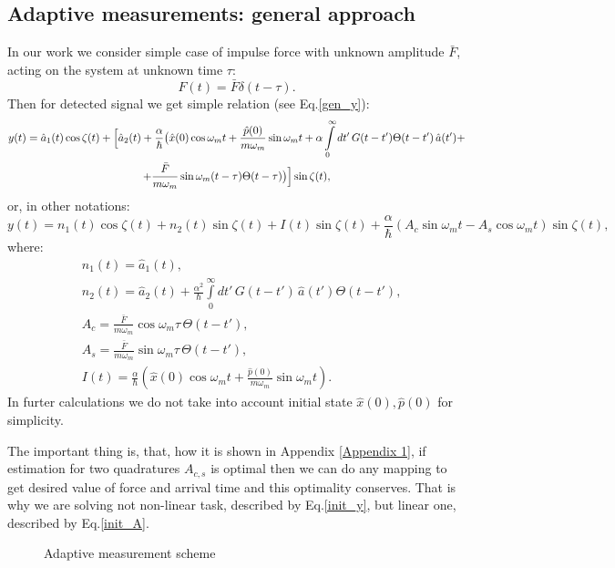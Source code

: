 \subsection{Adaptive measurements: general approach}
In our work we consider simple case of impulse force with unknown amplitude $\bar{F}$, acting on the system at unknown time $\tau$: 
\begin{equation}
 F(t)=\bar{F}\delta(t-\tau).
\end{equation}
Then for detected signal we get simple relation (see Eq.\ref{gen_y}):
\begin{multline}\label{init_y}
 y(t)=\hat{a}_1(t)\cos \zeta(t)+\Bigl[\hat{a}_2(t)+\frac{\alpha}{\hbar}\bigl(\hat{x}(0) \cos \omega_m t+ \frac{\hat{p}(0)}{m \omega_m} \sin \omega_m t + \alpha \int\limits_0^{\infty} dt' \, G(t-t') \Theta(t-t')\, \hat{a}(t') +\\+ \frac{\bar{F}}{m\omega_m}\sin\omega_m(t-\tau)\Theta(t-\tau)\bigr)\Bigr]\sin\zeta(t),
\end{multline}
or, in other notations:
\begin{equation}\label{init_A}
 y(t)=n_1(t)\cos\zeta(t)+  n_2(t)\sin\zeta(t) + I(t) \sin\zeta(t) + \frac{\alpha}{\hbar}(A_c\sin\omega_mt - A_s\cos\omega_mt)\sin\zeta(t),
\end{equation}
where:
\begin{align}
& n_1(t)=\hat{a}_1(t),\\
& n_2(t)=\hat{a}_2(t)+\frac{\alpha^2}{\hbar}\int\limits_0^{\infty} dt' \, G(t-t') \, \hat{a}(t') \Theta(t-t'),\\
& A_c = \frac{\bar{F}}{m\omega_m}\cos\omega_m\tau\,\Theta(t-t'),\\
& A_s = \frac{\bar{F}}{m\omega_m}\sin\omega_m\tau\,\Theta(t-t'),\\
& I(t) = \frac{\alpha}{\hbar}(\hat{x}(0) \cos \omega_m t+ \frac{\hat{p}(0)}{m \omega_m} \sin \omega_m t).
\end{align}
In furter calculations we do not take into account initial state $\hat{x}(0),\hat{p}(0)$ for simplicity.

The important thing is, that, how it is shown in Appendix \ref{Appendix 1}, if estimation for two quadratures $A_{c,s}$ is optimal then we can do any mapping to get desired value of force and arrival time and this optimality conserves.
That is why we are solving not non-linear task, described by Eq.\ref{init_y}, but linear one, described by Eq.\ref{init_A}. 
\begin{figure}[t]
\caption{Adaptive measurement scheme}
\label{pic:adaptive_process}
\end{figure}

